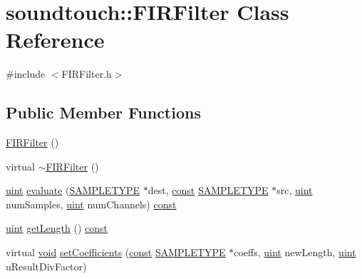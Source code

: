 \hypertarget{classsoundtouch_1_1_f_i_r_filter}{}\section{soundtouch\+:\+:F\+I\+R\+Filter Class Reference}
\label{classsoundtouch_1_1_f_i_r_filter}


{\ttfamily \#include $<$F\+I\+R\+Filter.\+h$>$}

\subsection*{Public Member Functions}
\begin{DoxyCompactItemize}
\item 
\hyperlink{classsoundtouch_1_1_f_i_r_filter_a39141358fb43d609855ebca52727997f}{F\+I\+R\+Filter} ()
\item 
virtual \hyperlink{classsoundtouch_1_1_f_i_r_filter_a7d376351ab71190d49b8b7abaa304767}{$\sim$\+F\+I\+R\+Filter} ()
\item 
\hyperlink{_s_t_types_8h_a91ad9478d81a7aaf2593e8d9c3d06a14}{uint} \hyperlink{classsoundtouch_1_1_f_i_r_filter_a7fa5b31a139badbadb272aeb412ec980}{evaluate} (\hyperlink{namespacesoundtouch_a97cfd29a7abb4d4b2a72f803d5b5850c}{S\+A\+M\+P\+L\+E\+T\+Y\+PE} $\ast$dest, \hyperlink{getopt1_8c_a2c212835823e3c54a8ab6d95c652660e}{const} \hyperlink{namespacesoundtouch_a97cfd29a7abb4d4b2a72f803d5b5850c}{S\+A\+M\+P\+L\+E\+T\+Y\+PE} $\ast$src, \hyperlink{_s_t_types_8h_a91ad9478d81a7aaf2593e8d9c3d06a14}{uint} num\+Samples, \hyperlink{_s_t_types_8h_a91ad9478d81a7aaf2593e8d9c3d06a14}{uint} num\+Channels) \hyperlink{getopt1_8c_a2c212835823e3c54a8ab6d95c652660e}{const} 
\item 
\hyperlink{_s_t_types_8h_a91ad9478d81a7aaf2593e8d9c3d06a14}{uint} \hyperlink{classsoundtouch_1_1_f_i_r_filter_a0416006ff1fe7a8dc0b0506c966d03b1}{get\+Length} () \hyperlink{getopt1_8c_a2c212835823e3c54a8ab6d95c652660e}{const} 
\item 
virtual \hyperlink{sound_8c_ae35f5844602719cf66324f4de2a658b3}{void} \hyperlink{classsoundtouch_1_1_f_i_r_filter_aa34eceb950aa83e7272016cec90d98d0}{set\+Coefficients} (\hyperlink{getopt1_8c_a2c212835823e3c54a8ab6d95c652660e}{const} \hyperlink{namespacesoundtouch_a97cfd29a7abb4d4b2a72f803d5b5850c}{S\+A\+M\+P\+L\+E\+T\+Y\+PE} $\ast$coeffs, \hyperlink{_s_t_types_8h_a91ad9478d81a7aaf2593e8d9c3d06a14}{uint} new\+Length, \hyperlink{_s_t_types_8h_a91ad9478d81a7aaf2593e8d9c3d06a14}{uint} u\+Result\+Div\+Factor)
\end{DoxyCompactItemize}
